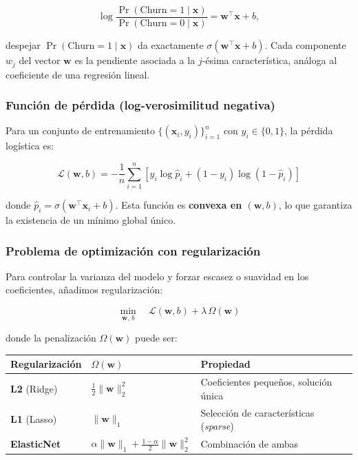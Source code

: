 \documentclass[spanish]{article}
\begin{document}
\begin{equation}
\log \frac{\Pr(\text{Churn}=1 \mid \mathbf{x})}{\Pr(\text{Churn}=0 \mid \mathbf{x})} = \mathbf{w}^\top \mathbf{x} + b,
\end{equation}

despejar $\Pr(\text{Churn}=1 \mid \mathbf{x})$ da exactamente $\sigma(\mathbf{w}^\top \mathbf{x} + b)$. Cada componente $w_j$ del vector $\mathbf{w}$ es la pendiente asociada a la $j$-ésima característica, análoga al coeficiente de una regresión lineal.

\subsubsection{Función de pérdida (log-verosimilitud negativa)}

Para un conjunto de entrenamiento $\{(\mathbf{x}_i, y_i)\}_{i=1}^{n}$ con $y_i \in \{0,1\}$, la pérdida logística es:

\begin{equation}
\mathcal{L}(\mathbf{w}, b) = -\frac{1}{n} \sum_{i=1}^{n} \left[ y_i \log \hat{p}_i + (1-y_i) \log(1-\hat{p}_i) \right]
\end{equation}

donde $\hat{p}_i = \sigma(\mathbf{w}^\top \mathbf{x}_i + b)$. Esta función es \textbf{convexa en $(\mathbf{w}, b)$}, lo que garantiza la existencia de un mínimo global único.

\subsubsection{Problema de optimización con regularización}

Para controlar la varianza del modelo y forzar escasez o suavidad en los coeficientes, añadimos regularización:

\begin{equation}
\min_{\mathbf{w},\, b} \quad \mathcal{L}(\mathbf{w}, b) + \lambda \, \Omega(\mathbf{w})
\end{equation}

donde la penalización $\Omega(\mathbf{w})$ puede ser:

\begin{center}
\begin{tabular}{lll}
\toprule
\textbf{Regularización} & $\Omega(\mathbf{w})$ & \textbf{Propiedad} \\
\midrule
\textbf{L2} (Ridge)   & $\frac{1}{2}\|\mathbf{w}\|_2^2$                                       & Coeficientes pequeños, solución única \\
\textbf{L1} (Lasso)   & $\|\mathbf{w}\|_1$                                                    & Selección de características (\textit{sparse}) \\
\textbf{ElasticNet}   & $\alpha\|\mathbf{w}\|_1 + \frac{1-\alpha}{2}\|\mathbf{w}\|_2^2$       & Combinación de ambas \\
\bottomrule
\end{tabular}
\end{center}
\end{document}
